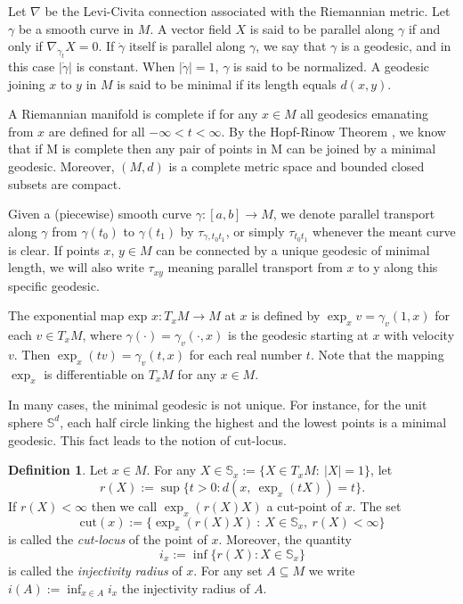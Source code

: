 \documentclass[a4paper]{article}
\numberwithin{equation}{section}
\theoremstyle{definition}
\newtheorem{definition}[theorem]{Definition}
\begin{document}
Let $\nabla$ be the Levi-Civita connection associated with the Riemannian metric. Let $\gamma$ be a smooth curve in $M$. A vector ﬁeld $X$ is said to be parallel along $\gamma$ if and only if $\nabla_{\dot{\gamma}_t} X = 0$. If $\dot{\gamma}$ itself is parallel along $\gamma$, we say that $\gamma$ is a geodesic, and in this case $|\dot{\gamma}|$ is constant. When $ |\dot{\gamma}|= 1$, $\gamma$ is said to be normalized. A geodesic joining $x$ to $y$ in $M$ is said to be minimal if its length equals $d(x,y)$.
\par
A Riemannian manifold is complete if for any $x\in M $ all geodesics emanating from $x$ are deﬁned for all $-\infty< t <\infty$. By the Hopf-Rinow Theorem \cite[Theorem 6.13]{L1997}, we know that if M is complete then any pair of points in M can be joined by a minimal geodesic. Moreover, $(M,d)$ is a complete metric space and bounded closed subsets are compact.


Given a (piecewise) smooth curve $\gamma : [a, b] \to M$, we denote parallel transport along $\gamma$ from $\gamma (t_0 )$ to $\gamma (t_1 )$ by $\tau_{\gamma,t_0t_1}$, or simply $\tau_{t_0t_1}$ whenever the meant curve is clear. If points $x$, $y\in M$ can be connected by a unique geodesic of minimal length, we will also write $\tau_{xy}$ meaning parallel transport from $x$ to y along this specific geodesic.

The exponential map exp $x: T_x M\to M$ at $x$ is deﬁned by $\exp_x v = \gamma_v(1,x)$ for each $v\in T_xM$, where $\gamma (\cdot) =\gamma_v (\cdot,x)$ is the geodesic starting at $x$ with velocity $v$. Then $\exp_x(tv) =\gamma_v(t,x)$ for each real number $t$. Note that the mapping $\exp_x$ is differentiable on $T_xM$ for any $x\in M$.

In many cases, the minimal geodesic is not unique. For instance, for the unit sphere $\mathbb{S}^d $, each half circle linking the highest and the lowest points is a minimal geodesic. This fact leads to the notion of cut-locus.

\begin{definition}
	Let $x\in M$. For any $X\in \mathbb{S}_x:=\{X\in T_xM:~|X|=1\}$, let
	\begin{equation*}
		r(X):=\sup\{t>0:d(x,~\exp_x(tX))=t\}.
	\end{equation*}
	If $r(X)<\infty$ then we call $\exp_x(r(X)X)$ a cut-point of $x$. The set
	\begin{equation*}
		\mathrm{cut}(x):=\{\exp_x(r(X)X)~:~X\in \mathbb{S}_x,~r(X)<\infty\}
	\end{equation*}
	is called the \textit{cut-locus} of the point of $x$. Moreover, the quantity
	\begin{equation*}
		i_x:=\inf\{r(X):X\in \mathbb{S}_x\}
	\end{equation*}
	is called the \textit{injectivity radius} of $x$. For any set $A \subseteq M$ we write $i(A) := \inf_{x\in A} i_x $ the injectivity radius of $A$.
\end{definition}
\end{document}
